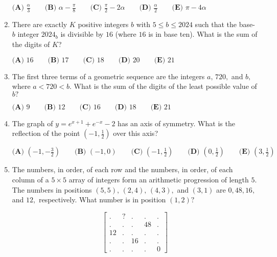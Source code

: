 \documentclass{article}
\begin{document}
\begin{enumerate}[label=\arabic*., itemsep=0.5em]
\(
\textbf{(A) }\frac{\alpha}{3}\qquad
\textbf{(B) }\alpha - \frac{\pi}{8}\qquad
\textbf{(C) }\frac{\pi}{2} - 2\alpha \qquad
\textbf{(D) }\frac{\alpha}{2}\qquad
\textbf{(E) }\pi - 4\alpha\qquad
\)\par \vspace{0.5em}\item There are exactly \(K\) positive integers \(b\) with \(5 \leq b \leq 2024\) such that the base-\(b\) integer \(2024_b\) is divisible by \(16\) (where \(16\) is in base ten). What is the sum of the digits of \(K\)?

\(\textbf{(A) }16\qquad\textbf{(B) }17\qquad\textbf{(C) }18\qquad\textbf{(D) }20\qquad\textbf{(E) }21\)\par \vspace{0.5em}\item The first three terms of a geometric sequence are the integers \(a,\,720,\) and \(b,\) where \(a<720<b.\) What is the sum of the digits of the least possible value of \(b?\)

\(\textbf{(A) } 9 \qquad \textbf{(B) } 12 \qquad \textbf{(C) } 16 \qquad \textbf{(D) } 18 \qquad \textbf{(E) } 21\)\par \vspace{0.5em}\item The graph of \(y=e^{x+1}+e^{-x}-2\) has an axis of symmetry. What is the reflection of the point \((-1,\tfrac{1}{2})\) over this axis?

\(\textbf{(A) }\left(-1,-\frac{3}{2}\right)\qquad\textbf{(B) }(-1,0)\qquad\textbf{(C) }\left(-1,\tfrac{1}{2}\right)\qquad\textbf{(D) }\left(0,\frac{1}{2}\right)\qquad\textbf{(E) }\left(3,\frac{1}{2}\right)\)\par \vspace{0.5em}\item The numbers, in order, of each row and the numbers, in order, of each column of a \(5 \times 5\) array of integers form an arithmetic progression of length \(5{.}\) The numbers in positions \((5, 5), \,(2,4),\,(4,3),\) and \((3, 1)\) are \(0, 48, 16,\) and \(12{,}\) respectively. What number is in position \((1, 2)?\)

\begin{equation*}
\begin{bmatrix} . & ? &.&.&. \\ .&.&.&48&.\\ 12&.&.&.&.\\ .&.&16&.&.\\ .&.&.&.&0\end{bmatrix}
\end{equation*}


\end{enumerate}
\end{document}
